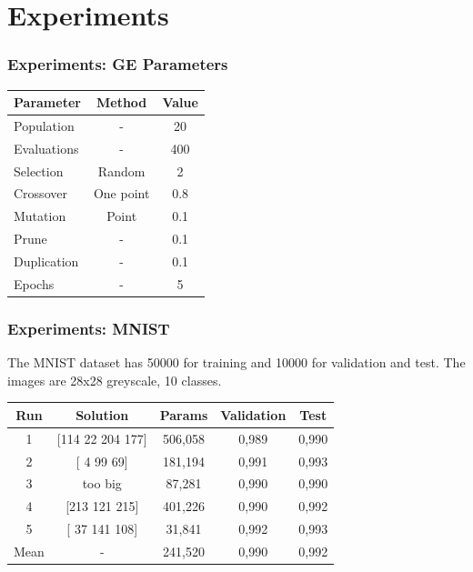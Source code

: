 \documentclass[aspectratio=169]{beamer}
\begin{document}
	\section{Experiments}
		\begin{frame}
			\frametitle{Experiments: GE Parameters}
			
			\begin{table}
				\begin{tabular}{l|c|c}
					\textbf{Parameter} & \textbf{Method} & \textbf{Value} \\ \hline
					Population         &        -        &       20       \\
					Evaluations        &        -        &      400       \\
					Selection          &     Random      &       2        \\
					Crossover          &    One point    &      0.8       \\
					Mutation           &      Point      &      0.1       \\
					Prune              &        -        &      0.1       \\
					Duplication        &        -        &      0.1       \\
					Epochs             &        -        &       5        \\ \hline
				\end{tabular}
			\end{table}
		
		\end{frame}
		\begin{frame}
			\frametitle{Experiments: MNIST}

			The MNIST dataset has 50000 for training and 10000 for validation and test. The images are 28x28 greyscale, 10 classes.
			
			\begin{table}
				\begin{tabular}{c|c|c|c|c}
					\hline
					Run  &     Solution      & Params & Validation & Test  \\ \hline
					 1   & [114  22 204 177] & 506,058 &   0,989    & 0,990 \\
					 2   &    [ 4 99 69]     & 181,194 &   0,991    & 0,993 \\
					 3   &      too big      & 87,281  &   0,990    & 0,990 \\
					 4   &   [213 121 215]   & 401,226 &   0,990    & 0,992 \\
					 5   &   [ 37 141 108]   & 31,841  &   0,992    & 0,993 \\
					Mean &         -         & 241,520 &   0,990    & 0,992 \\ \hline
				\end{tabular}
			\end{table}

		\end{frame}
\end{document}
